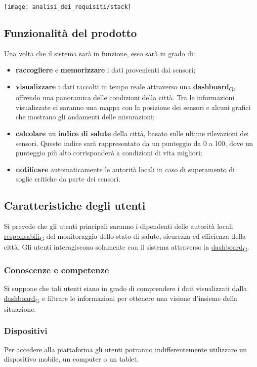 \begin{center}
	\texttt{[image: analisi\_dei\_requisiti/stack]}
\end{center}

\subsection{Funzionalità del prodotto}
Una volta che il sistema sarà in funzione, esso sarà in grado di:
\begin{itemize}
	\item \textbf{raccogliere} e \textbf{memorizzare} i dati provenienti dai sensori;
	\item \textbf{visualizzare} i dati raccolti in tempo reale attraverso una \href{https://7last.github.io/docs/rtb/documentazione-interna/glossario\#dashboard}{\textbf{dashboard}\textsubscript{G}}, offrendo una panoramica delle condizioni della città.
	      Tra le informazioni visualizzate ci saranno una mappa con la posizione dei sensori e alcuni grafici che mostrano gli andamenti delle misurazioni;
	\item \textbf{calcolare} un \textbf{indice di salute} della città, basato sulle ultime rilevazioni dei sensori. Questo indice sarà rappresentato da un punteggio da 0 a 100, dove un punteggio più alto corrisponderà a condizioni di vita migliori;
	\item \textbf{notificare} automaticamente le autorità locali in caso di superamento di soglie critiche da parte dei sensori.
\end{itemize}

\subsection{Caratteristiche degli utenti}
Si prevede che gli utenti principali saranno i dipendenti delle autorità locali \href{https://7last.github.io/docs/rtb/documentazione-interna/glossario\#responsabile}{responsabili\textsubscript{G}}
del monitoraggio dello stato di salute, sicurezza ed efficienza della città.
Gli utenti interagiscono solamente con il sistema attraverso la \href{https://7last.github.io/docs/rtb/documentazione-interna/glossario\#dashboard}{dashboard\textsubscript{G}}.

\subsubsection{Conoscenze e competenze}
Si suppone che tali utenti siano in grado di comprendere i dati visualizzati dalla \href{https://7last.github.io/docs/rtb/documentazione-interna/glossario\#dashboard}{dashboard\textsubscript{G}} e filtrare le informazioni
per ottenere una visione d'insieme della situazione.

\subsubsection{Dispositivi}
Per accedere alla piattaforma gli utenti potranno indifferentemente utilizzare un dispositivo mobile, un computer o un tablet.






